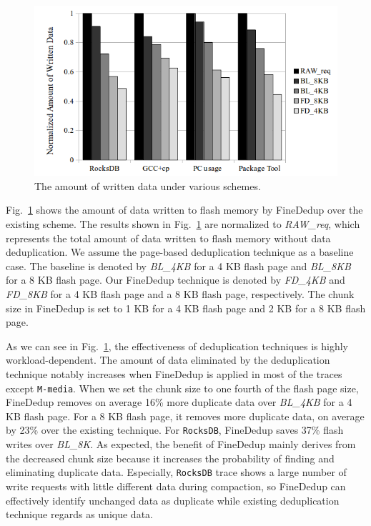 \begin{figure}[t]
	\center
	\includegraphics[scale=0.6]{figure/finededup/dataReduction_Chunksize_less_}
	\caption{The amount of written data under various schemes.} %
	\label{fig:reducedData}
\end{figure}


Fig.~\ref{fig:reducedData} shows the amount of data written to flash memory by FineDedup over the existing scheme.
The results shown in Fig.~\ref{fig:reducedData} are normalized to \textit{RAW\_req},
which represents the total amount of data written to flash memory without data deduplication.
We assume the page-based deduplication technique as a baseline case.
The baseline is denoted by \textit{BL\_4KB} for a 4 KB flash page and \textit{BL\_8KB} for a 8 KB flash page.
Our FineDedup technique is denoted by \textit{FD\_4KB} and \textit{FD\_8KB} for a 4 KB flash page and 
a 8 KB flash page, respectively.
The chunk size in FineDedup is set to 1 KB for a 4 KB flash page and 2 KB for a 8 KB flash page.

As we can see in Fig.~\ref{fig:reducedData}, 
the effectiveness of deduplication techniques is highly workload-dependent. 
The amount of data eliminated by the deduplication technique notably increases 
when FineDedup is applied in most of the traces except \texttt{M-media}.
When we set the chunk size to one fourth of the flash page size, 
FineDedup removes on average 16\% more duplicate data 
over \textit{BL\_4KB} for a 4 KB flash page.
For a 8 KB flash page, 
it removes more duplicate data, on average by 23\% over the existing technique.
For \texttt{RocksDB}, FineDedup saves 37\% flash writes over \textit{BL\_8K}.
As expected, the benefit of FineDedup mainly derives from the decreased chunk size 
because it increases the probability of finding and eliminating duplicate data.
Especially, \texttt{RocksDB} trace shows a large number of write requests with little different data during
compaction, so FineDedup can effectively 
identify unchanged data as duplicate while existing deduplication technique regards as unique data.

